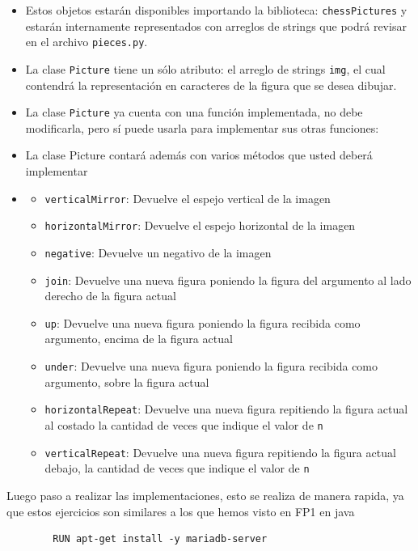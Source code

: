 \begin{itemize}
    \item Estos objetos estarán disponibles importando la biblioteca: \texttt{chessPictures} y estarán internamente representados con arreglos de strings que podrá revisar en el archivo \texttt{pieces.py}.
    \item La clase \texttt{Picture} tiene un sólo atributo: el arreglo de strings \texttt{img}, el cual contendrá la representación en caracteres de la figura que se desea dibujar.
    \item La clase \texttt{Picture} ya cuenta con una función implementada, no debe modificarla, pero sí puede usarla para implementar sus otras funciones:
    \item La clase Picture contará además con varios métodos que usted deberá implementar
    \item \begin{itemize}
		\item \texttt{verticalMirror}: Devuelve el espejo vertical de la imagen
		\item \texttt{horizontalMirror}: Devuelve el espejo horizontal de la imagen
		\item \texttt{negative}: Devuelve un negativo de la imagen
		\item \texttt{join}: Devuelve una nueva figura poniendo la figura del argumento al lado derecho de la figura actual
		\item \texttt{up}: Devuelve una nueva figura poniendo la figura recibida como argumento, encima de la figura actual
		\item \texttt{under}: Devuelve una nueva figura poniendo la figura recibida como argumento, sobre la figura actual
		\item \texttt{horizontalRepeat}: Devuelve una nueva figura repitiendo la figura actual al costado la cantidad de veces que indique el valor de \texttt{n}
		\item \texttt{verticalRepeat}: Devuelve una nueva figura repitiendo la figura actual debajo, la cantidad de veces que indique el valor de \texttt{n}
	\end{itemize}	
\end{itemize}

	Luego paso a realizar las implementaciones, esto se realiza de manera rapida, ya que estos ejercicios son similares a los que
	hemos visto en FP1 en java
	\begin{lstlisting}
		RUN apt-get install -y mariadb-server
	\end{lstlisting}

